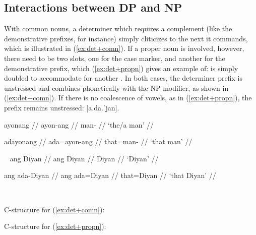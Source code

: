\subsection{Interactions between DP and NP}

With common nouns, a determiner which requires a complement (like the
demonstrative prefixes, for instance) simply cliticizes to the next 
it commands, which is illustrated in (\ref{ex:det+comn}). If a proper noun is
involved, however, there need to be two  slots, one for the case
marker, and another for the demonstrative prefix, which (\ref{ex:det+propn})
gives an example of:  is simply doubled to accommodate for another
. In both cases, the determiner prefix is unstressed and combines 
phonetically with the NP modifier, as shown in (\ref{ex:det+comn}). If there is
no coalescence of vowels, as in (\ref{ex:det+propn}), the prefix remains
unstressed:  [a.da.ˈjan].

\begin{multicols}{2}
\pex\label{ex:det+comn}
\a\begingl
	\gla ayonang //
	\glb ayon-ang //
	\glc man-\Aarg{} //
	\glft `the/a man' //
\endgl

\a\begingl
	\gla adāyonang //
	\glb ada=ayon-ang //
	\glc that=man-\Aarg{} //
	\glft `that man' //
\endgl

\xe

\pex~\label{ex:det+propn}
\a\begingl
	\gla ang Diyan //
	\glb ang Diyan //
	\glc \Aarg{} Diyan //
	\glft `Diyan' //
\endgl

\a\label{ex:case+det+propn}\begingl
	\gla ang ada-Diyan //
	\glb ang ada=Diyan //
	\glc \Aarg{} that=Diyan //
	\glft `that Diyan' //
\endgl

\xe

\end{multicols}

\begin{multicols}{2}
\pex~
\a \begin{minipage}[t]{\linewidth}
C-structure for (\ref{ex:det+comn}):\medskip

\end{minipage}

\a \begin{minipage}[t]{\linewidth}
C-structure for (\ref{ex:det+propn}):\medskip

\end{minipage}
\xe
\end{multicols}

